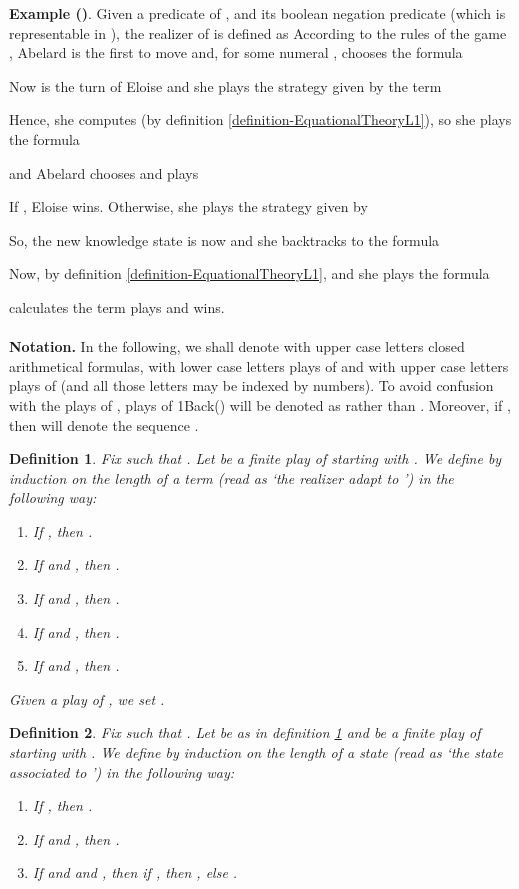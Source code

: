 \documentclass[copyright,creativecommons]{eptcs}
\newtheorem{definition}{Definition}
\begin{document}
\textbf{Example ()}. Given a predicate  of , and its boolean negation predicate  (which is representable in ), the realizer  of  
  is defined as 
According to the rules of the game , Abelard is the first to move and, for some numeral , chooses the formula


Now is the turn of Eloise 
and she plays the strategy given by the term


Hence, she computes  (by definition \ref{definition-EquationalTheoryL1}), so she plays the formula 

and Abelard chooses  and plays 


If , Eloise wins. Otherwise, she plays the strategy given by 

So, the new knowledge state is now  and she backtracks to the formula


Now, by definition \ref{definition-EquationalTheoryL1},  and she plays the formula


calculates the term 
plays  and wins.\\\\
\textbf{Notation.} In the following, we shall denote with upper case letters 
closed arithmetical formulas, with lower case letters 
plays of  and with upper case letters   plays of
 (and all those letters may be indexed by numbers). To avoid confusion with the plays of , plays of 1Back() will be denoted as  rather than . Moreover, if , then  will denote the sequence .

 \begin{definition}\label{adaptrealizer}
 Fix  such that . Let   be a finite play of
 starting with . We define by induction on the length of
 a term  (read as `the realizer adapt
to ')  in the following way: \begin{enumerate} 
\item If , then
. \item If  and
, then . 
\item If  and ,
then . 
\item  If 
and , then . 
\item If
 and , then
.\end{enumerate}
 Given a play  of , we set
.

\end{definition}

\begin{definition}\label{adaptstate}
 Fix  such that . Let  be as in definition \ref{adaptrealizer} and  be a finite play of  starting with . We
define by induction on the length of  a state  (read
as  `the state associated to ') in the following way:
\begin{enumerate} 
\item If , then .
\item If  and , then
.
 \item If  and  and , then if , then
, else .\end{enumerate}

\end{definition}
\end{document}
